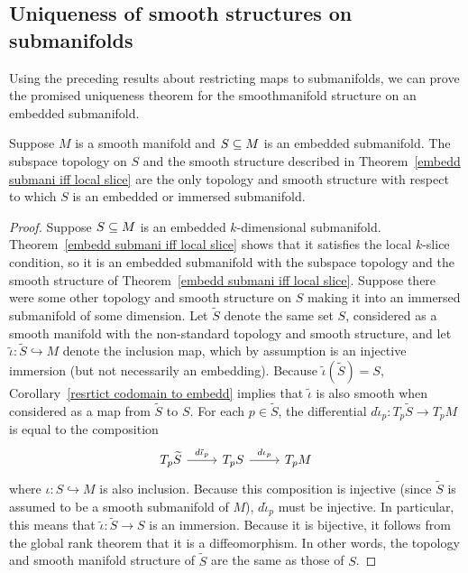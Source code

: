 \subsection{Uniqueness of smooth structures on submanifolds}
Using the preceding results about restricting maps to submanifolds, we can prove the promised uniqueness theorem for the smoothmanifold structure on an embedded
submanifold.
\begin{theorem}\label{unique smooth embedd}
Suppose $M$ is a smooth manifold and $S\subseteq M$ is an embedded submanifold. The subspace topology on $S$ and the smooth structure described in Theorem~\ref{embedd submani iff local slice} are the only topology and smooth structure with respect to which $S$ is an embedded or immersed submanifold.
\end{theorem}
\begin{proof}
Suppose $S\subseteq M$ is an embedded $k$-dimensional submanifold. Theorem~\ref{embedd submani iff local slice} shows that it satisfies the local $k$-slice condition, so it is an embedded submanifold with the subspace topology and the smooth structure of Theorem~\ref{embedd submani iff local slice}. Suppose there were some other topology and smooth structure on $S$ making it into an immersed submanifold of some dimension. Let $\widetilde{S}$ denote the same set $S$, considered as a smooth manifold with the non-standard topology and smooth structure, and let $\tilde{\iota}:\widetilde{S}\hookrightarrow M$ denote the inclusion map, which by assumption is an injective immersion (but not necessarily an embedding). Because $\tilde{\iota}(\widetilde{S})=S$, Corollary~\ref{resrtict codomain to embedd} implies that $\tilde{\iota}$ is also smooth when considered as a map from $\widetilde{S}$ to $S$. For each $p\in\widetilde{S}$, the differential $d\tilde{\iota}_p:T_p\widetilde{S}\to T_pM$ is equal to the composition
\[\begin{tikzcd}
T_p\widetilde{S}\ar[r,"d\tilde{\iota}_p"]&T_pS\ar[r,"d\iota_p"]&T_pM
\end{tikzcd}\]
where $\iota:S\hookrightarrow M$ is also inclusion. Because this composition is injective (since $\widetilde{S}$ is assumed to be a smooth submanifold of $M$), $d\tilde{\iota}_p$ must be injective. In particular, this means that $\tilde{\iota}:\widetilde{S}\to S$ is an immersion. Because it is bijective, it follows from the global rank theorem that it is a diffeomorphism. In other words, the topology and smooth manifold structure of $\widetilde{S}$ are the same as those of $S$.
\end{proof}

